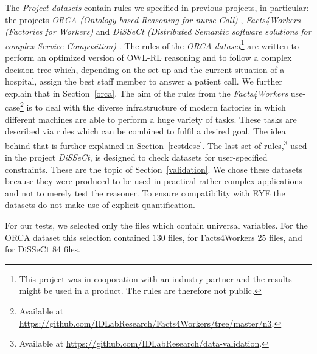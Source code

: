 The \emph{Project datasets} contain rules we specified in previous projects, in particular: 
the projects \emph{ORCA (Ontology based Reasoning for nurse Call)} \cite{ORCA,ORCA2}, \emph{Facts4Workers (Factories for Workers)} \cite{arndt_ruleml_industry_2016} 
and \emph{DiSSeCt (Distributed Semantic software solutions for complex Service Composition)}
\cite{ruleml2017}. 
%
The rules of the 
\emph{ORCA dataset}\footnote{This 
project was in cooporation with an industry partner and the results might be used in a product. The rules are therefore not public.}
 are written to perform an optimized version of OWL-RL reasoning and to follow a complex decision tree which, depending on the set-up and the 
current situation of a hospital, assign the best staff member to answer a patient call. We further explain that in Section~\ref{orca}.
%
The aim of the rules from the \emph{Facts4Workers} use-case\footnote{Available at \url{https://github.com/IDLabResearch/Facts4Workers/tree/master/n3}.}
is to deal with the diverse infrastructure of modern factories in which different machines are able to perform a huge variety of tasks.
These tasks are described via rules which can be combined to fulfil a desired goal. The idea behind that is further explained in Section~\ref{restdesc}.
%
The last set of rules,\footnote{Available at \url{https://github.com/IDLabResearch/data-validation}. }
used in the project \emph{DiSSeCt}, is designed to check \rdf datasets for user-specified constraints. These are the topic of Section~\ref{validation}.
%
We chose these datasets because they were produced to be used in practical rather complex applications and not to merely test the reasoner. 
To ensure compatibility with EYE
the datasets do not make use of explicit quantification.

For our tests, we selected only the files which contain universal variables. For the ORCA dataset this selection contained 130 files, for Facts4Workers 25 files,
and for DiSSeCt 84 files.


